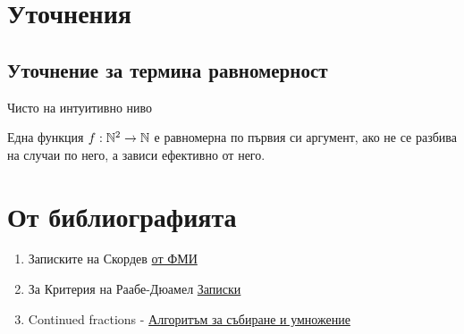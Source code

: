     \section{Уточнения}
    \subsection{Уточнение за термина равномерност}
    Чисто на интуитивно ниво
    
    Една функция $f: {\mathbb{N}}^2 \to {\mathbb{N}}$ е равномерна по първия си аргумент, ако не се разбива на случаи по него, а зависи ефективно от него.
    \section{От библиографията}
    \begin{enumerate}
        \item Записките на Скордев
            \subitem \href{https://store.fmi.uni-sofia.bg/fmi/logic/skordev/ln/cia/}{от ФМИ}
        \item За Критерия на Раабе-Дюамел 
            \subitem \href{https://mariyavouniversitymaths.files.wordpress.com/2018/01/d0b8d0b7d181d0bbd0b5d0b4d0b2d0b0d0bdd0b5-d0b7d0b0-d181d185d0bed0b4d0b8d0bcd0bed181d182-d0bdd0b0-d180d0b5d0b4d0bed0b2d0b5-d181-d0bad18021.pdf}{Записки}
        \item Continued fractions
            \subitem {}\cite{gosper2003continued} - \href{https://perl.plover.com/classes/cftalk/INFO/}{Алгоритъм за събиране и умножение}
            \subitem {}\cite{gosper1977continued}
    \end{enumerate}
    \nocite{*}
\fi

\printbibliography
